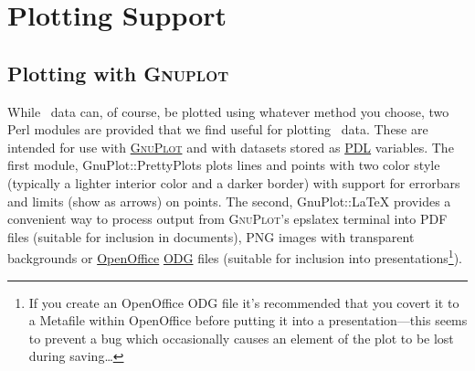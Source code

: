\chapter{Plotting Support}

\section{Plotting with {\normalfont \scshape Gnuplot}}

While \glc\ data can, of course, be plotted using whatever method you choose, two Perl modules are provided that we find useful for plotting \glc\ data. These are intended for use with \href{http://www.gnuplot.info/}{\normalfont \scshape GnuPlot} and with datasets stored as \href{http://pdl.perl.org/}{\normalfont \ttfamily PDL} variables. The first module, {\normalfont \ttfamily GnuPlot::PrettyPlots} plots lines and points with two color style (typically a lighter interior color and a darker border) with support for errorbars and limits (show as arrows) on points. The second, {\normalfont \ttfamily GnuPlot::LaTeX} provides a convenient way to process output from {\normalfont \scshape GnuPlot}'s {\normalfont \ttfamily epslatex} terminal into PDF files (suitable for inclusion in documents), PNG images with transparent backgrounds or \href{http://www.openoffice.org/}{OpenOffice} \href{http://www.wikimedia.org/wikipedia/en/wiki/OpenDocument}{ODG} files (suitable for inclusion into presentations\footnote{If you create an OpenOffice ODG file it's recommended that you covert it to a Metafile within OpenOffice before putting it into a presentation---this seems to prevent a bug which occasionally causes an element of the plot to be lost during saving\ldots}).

